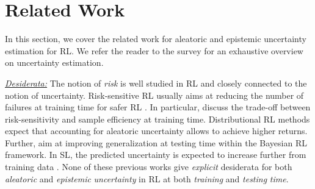 \vspace{-3mm}
\section{Related Work}
\label{sec:related_work_011}

In this section, we cover the related work for aleatoric and epistemic uncertainty estimation for RL. 
We refer the reader to the survey \cite{review-uncertainty-dl} for an exhaustive overview on uncertainty estimation. 

\underline{\textit{Desiderata:}} The notion of \emph{risk} is well studied in RL and closely connected to the notion of uncertainty. Risk-sensitive RL usually aims at reducing the number of failures at training time for safer RL \cite{risk-sensitive-rl, risk-constrained-rl-percentile, risk-sensitive-mdp, safe-rl-survey}. In particular, \cite{risk-uncertainty-deep-rl, rl-risk-sample-trade-off, epistemic-risk} discuss the trade-off between risk-sensitivity and sample efficiency at training time. Distributional RL methods expect that accounting for aleatoric uncertainty allows to achieve higher returns. Further, \cite{epistemic-pomdp} aim at improving generalization at testing time within the Bayesian RL framework. In SL, the predicted uncertainty is expected to increase further from training data \citep{provable-uncertainty, natpn, bayesian-a-bit, graph-postnet}. None of these previous works give \emph{explicit} desiderata for both \emph{aleatoric} and \emph{epistemic} \emph{uncertainty} in RL at both \emph{training} and \emph{testing} \emph{time}. 

